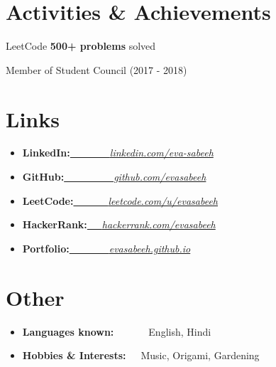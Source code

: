 \documentclass[a4paper,20pt]{article}
\newcommand{\resumeSimpleItem}[2]{
  \item\small{
    {#1}{#2 \vspace{-2pt}}
  }
}
\newcommand{\resumeSimpleSubItem}[2]{\resumeSimpleItem{#1}{#2}\vspace{-3pt}}
\newcommand{\resumeSubHeadingSimpleListStart}{\begin{itemize}[leftmargin=*]}
\newcommand{\resumeSubHeadingSimpleListEnd}{\end{itemize}}
\begin{document}
\section{Activities \& Achievements}
\begin{description}[font=$\bullet$]
  \item {LeetCode \textbf{500+ problems} solved}
  \vspace{-5pt}
  \item {Member of Student Council (2017 - 2018)}
  \vspace{-5pt}
  \end{description}
\vspace{2pt}



\section{Links}
\resumeSubHeadingSimpleListStart
\resumeSimpleSubItem{\textbf{LinkedIn:}}{\href{https://www.linkedin.com/in/eva-sabeeh/}{~~~~~~~~\emph{linkedin.com/eva-sabeeh}}}
\vspace{-1pt}
\resumeSimpleSubItem{\textbf{GitHub:}}{\href{https://www.github.com/evasabeeh/}{~~~~~~~~~~\emph{github.com/evasabeeh}}}
\vspace{-1pt}
\resumeSimpleSubItem{\textbf{LeetCode:}}{\href{https://www.leetcode.com/u/evasabeeh/}{~~~~~~~\emph{leetcode.com/u/evasabeeh}}}
\vspace{-1pt}
\resumeSimpleSubItem{\textbf{HackerRank:}}{\href{https://www.hackerrank.com/profile/evasabeeh}{~~~\emph{hackerrank.com/evasabeeh}}}
\vspace{-1pt}
\resumeSimpleSubItem{\textbf{Portfolio:}}{\href{https://evasabeeh.github.io/}{~~~~~~~~\emph{evasabeeh.github.io}}}
\vspace{-1pt}
\resumeSubHeadingSimpleListEnd
\vspace{2pt}



\section{Other}
\resumeSubHeadingSimpleListStart
\resumeSimpleSubItem {\textbf{Languages known:}}{~~~~~~~English, Hindi}
\vspace{-1pt}
\resumeSimpleSubItem{\textbf{Hobbies \& Interests:}}{~~~Music, Origami, Gardening}
\resumeSubHeadingSimpleListEnd
\vspace{2pt}
\end{document}
